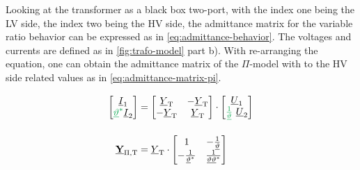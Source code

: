 Looking at the transformer as a black box two-port, with the index one being the \ac{LV} side, the index two being the \ac{HV} side, the admittance matrix for the variable ratio behavior can be expressed as in \autoref{eq:admittance-behavior}. 
The voltages and currents are defined as in \autoref{fig:trafo-model} part b). 
With re-arranging the equation, one can obtain the admittance matrix of the $\Pi$-model with to the \acs{HV} side related values as in \autoref{eq:admittance-matrix-pi}. \autocite{milano_2010,burlakin_2024}

\begin{align}
    \begin{bmatrix}
        \underline{I}_1 \\ {\color{ees_green}\underline{\vartheta}^*} \underline{I}_2
    \end{bmatrix}&= 
    \begin{bmatrix}
        \underline{Y}_\mathrm{T} & -\underline{Y}_\mathrm{T} \\
        -\underline{Y}_\mathrm{T} & \underline{Y}_\mathrm{T}
    \end{bmatrix} \cdot
    \begin{bmatrix}
        \underline{U}_1 \\ {\color{ees_green}\frac{1}{\underline{\vartheta}}}~\underline{U}_2
    \end{bmatrix} \label{eq:admittance-behavior} \\[12pt]
    \underline{\mab{Y}}_\mathrm{\Pi,T}&=\underline{Y}_\mathrm{T} \cdot
    \begin{bmatrix}
        1 & -\frac{1}{\underline{\vartheta}} \\
        -\frac{1}{\underline{\vartheta}^*} & \frac{1}{\underline{\vartheta}\underline{\vartheta}^*} 
    \end{bmatrix} \label{eq:admittance-matrix-pi}
\end{align}

